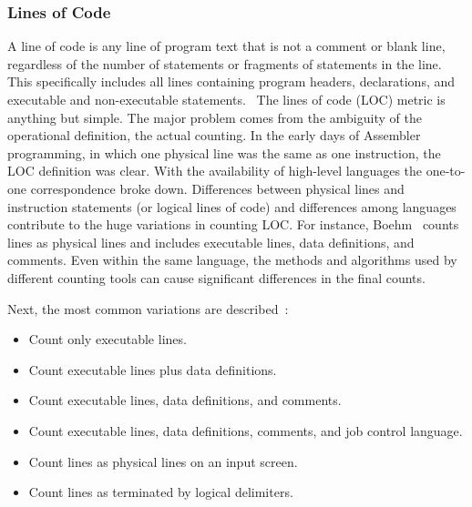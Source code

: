 \subsubsection{Lines of Code}
A line of code is any line of program text that is not a comment or blank line, 
regardless of the number of statements or fragments of statements in the line. 
This specifically includes all lines containing program headers, declarations, and executable and non-executable statements.~\cite{conte1986software}
The lines of code (LOC) metric is anything but simple. 
The major problem comes from the ambiguity of the operational definition, the actual counting.
In the early days of Assembler programming, in which one physical line was the same as one instruction, the LOC definition was clear.
With the availability of high-level languages the one-to-one correspondence broke down.
Differences between physical lines and instruction statements (or logical lines of code) 
and differences among languages contribute to the huge variations in counting LOC.
For instance, Boehm~\cite{boehm2009software} counts lines as physical lines and includes executable lines, data definitions, and comments. 
Even within the same language, the methods and algorithms used by different counting tools can cause significant differences in the final counts.

Next, the most common variations are described~\cite{jones1986programming}: 
\begin{itemize}
\item Count only executable lines. 
\item Count executable lines plus data definitions. 
\item Count executable lines, data definitions, and comments. 
\item Count executable lines, data definitions, comments, and job control language. 
\item Count lines as physical lines on an input screen. 
\item Count lines as terminated by logical delimiters. 
\end{itemize}


